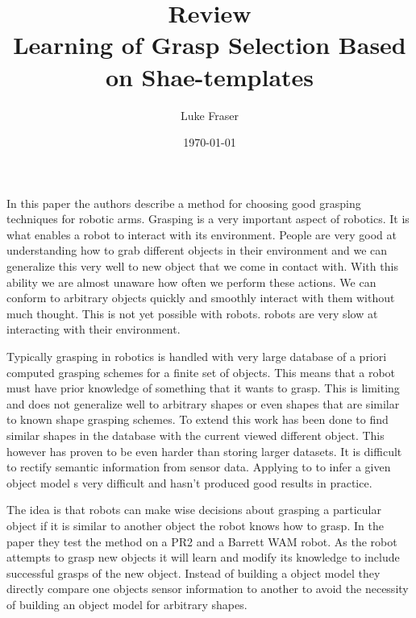 \documentclass{article}
\begin{document}
\title{{\large Review} \\ Learning of Grasp Selection Based on Shae-templates}
\author{Luke Fraser}
\date{\today}
\maketitle

\begingroup
\renewcommand{\section}[2]{}


\endgroup

\section*{Summary}
In this paper the authors describe a method for choosing good grasping techniques for robotic arms. Grasping is a very important aspect of robotics. It is what enables a robot to interact with its environment. People are very good at understanding how to grab different objects in their environment and we can generalize this very well to new object that we come in contact with. With this ability we are almost unaware how often we perform these actions. We can conform to arbitrary objects quickly and smoothly interact with them without much thought. This is not yet possible with robots. robots are very slow at interacting with their environment.

Typically grasping in robotics is handled with very large database of a priori computed grasping schemes for a finite set of objects. This means that a robot must have prior knowledge of something that it wants to grasp. This is limiting and does not generalize well to arbitrary shapes or even shapes that are similar to known shape grasping schemes. To extend this work has been done to find similar shapes in the database with the current viewed different object. This however has proven to be even harder than storing larger datasets. It is difficult to rectify semantic information from sensor data. Applying to to infer a given object model s very difficult and hasn't produced good results in practice.

The idea is that robots can make wise decisions about grasping a particular object if it is similar to another object the robot knows how to grasp. In the paper they test the method on a PR2 and a Barrett WAM robot. As the robot attempts to grasp new objects it will learn and modify its knowledge to include successful grasps of the new object. Instead of building a object model they directly compare one objects sensor information to another to avoid the necessity of building an object model for arbitrary shapes.
\end{document}
